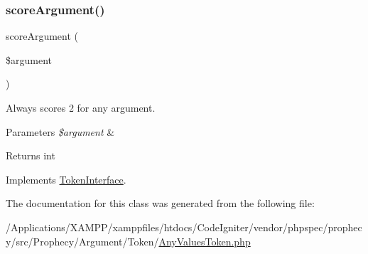 \subsubsection{\texorpdfstring{score\+Argument()}{scoreArgument()}}
{\footnotesize\ttfamily score\+Argument (\begin{DoxyParamCaption}\item[{}]{\$argument }\end{DoxyParamCaption})}

Always scores 2 for any argument.


\begin{DoxyParams}{Parameters}
{\em \$argument} & \\
\hline
\end{DoxyParams}
\begin{DoxyReturn}{Returns}
int 
\end{DoxyReturn}


Implements \mbox{\hyperlink{interface_prophecy_1_1_argument_1_1_token_1_1_token_interface_a8d5bf47ab6eaa935458d5ad160e52822}{Token\+Interface}}.



The documentation for this class was generated from the following file\+:\begin{DoxyCompactItemize}
\item 
/\+Applications/\+X\+A\+M\+P\+P/xamppfiles/htdocs/\+Code\+Igniter/vendor/phpspec/prophecy/src/\+Prophecy/\+Argument/\+Token/\mbox{\hyperlink{_any_values_token_8php}{Any\+Values\+Token.\+php}}\end{DoxyCompactItemize}

